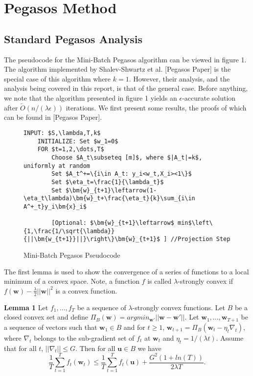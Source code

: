 \documentclass{article}
\begin{document}
\section{Pegasos Method}
\subsection{Standard Pegasos Analysis}
The pseudocode for the Mini-Batch Pegasos algorithm can be viewed in figure 1. The algorithm implemented by
Shalev-Shwartz et al. [Pegasos Paper] is the special case of this algorithm where $k=1$. However, their
analysis, and the analysis being covered in this report, is that of the general case. Before anything,
we note that the algorithm presented in figure 1 yields an $\epsilon$-accurate solution after
$\tilde{O}(n/(\lambda \epsilon))$ iterations. We first present some results, the proofs of which can be found in [Pegasos Paper].

\begin{figure}[h]
	\centering
    \begin{lstlisting}[frame=single, mathescape=true]
    INPUT: $S,\lambda,T,k$
    INITIALIZE: Set $w_1=0$
    FOR $t=1,2,\dots,T$
    	Choose $A_t\subseteq [m]$, where $|A_t|=k$, uniformly at random
        Set $A_t^+=\{i\in A_t: y_i<w_t,X_i><1\}$
        Set $\eta_t=\frac{1}{\lambda_t}$
        Set $\bm{w}_{t+1}\leftarrow(1-\eta_t\lambda)\bm{w}_t+\frac{\eta_t}{k}\sum_{i\in A^+_t}y_i\bm{x}_i$
        
        [Optional: $\bm{w}_{t+1}\leftarrow$ min$\left\{1,\frac{1/\sqrt{\lambda}}{||\bm{w_{t+1}}||}\right\}\bm{w}_{t+1}$ ] //Projection Step
    \end{lstlisting}
    \caption{Mini-Batch Pegasos Pseudocode}
\end{figure}


The first lemma is used to show the convergence of a series of functions to a local minimum of a convex
space.
Note, a function $f$ is called $\lambda$-strongly convex if $f(\mathbf{w})-\frac{\lambda}{2}||\mathbf{w}||^2$
is a convex function.

\textbf{Lemma 1} Let $f_1,\dots,f_T$ be a sequence of $\lambda$-strongly convex functions. Let $B$ be a closed
convex set and define $\Pi_B(\mathbf{w})=argmin_{\mathbf{w'}}||\mathbf{w}-\mathbf{w}'||$. Let
$\mathbf{w}_1,\dots,\mathbf{w}_{T+1}$ be a sequence of vectors such that $\mathbf{w}_1\in B$ and
for $t\geq 1$, $\mathbf{w}_{t+1}=\Pi_B(\mathbf{w}_t-\eta_t\nabla_t)$, where $\nabla_t$ belongs
to the sub-gradient set of $f_t$ at $\mathbf{w}_t$ and $\eta_t=1/(\lambda t)$. Assume that for all $t$,
$||\nabla_t||\leq G$. Then for all $\mathbf{u}\in B$ we have
$$\frac{1}{T}\sum_{t=1}^Tf_t(\mathbf{w}_t)\leq \frac{1}{T}\sum_{t=1}^Tf_t(\mathbf{u})+\frac{G^2(1+ln(T))}{2\lambda T}.$$
\end{document}
